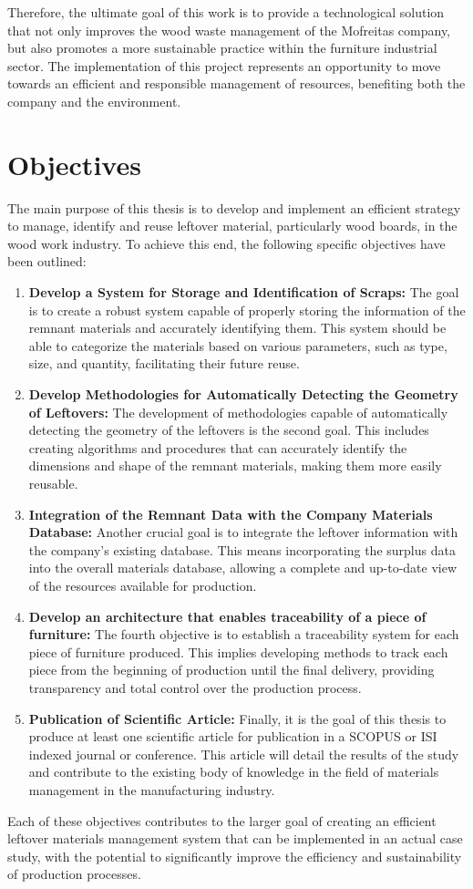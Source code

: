 Therefore, the ultimate goal of this work is to provide a technological solution that not only improves the wood waste management of the Mofreitas company, but also promotes a more sustainable practice within the furniture industrial sector. The implementation of this project represents an opportunity to move towards an efficient and responsible management of resources, benefiting both the company and the environment.


\section{Objectives}\label{cap:intro:objectives}

The main purpose of this thesis is to develop and implement an efficient strategy to manage, identify and reuse leftover material, particularly wood boards, in the wood work industry. To achieve this end, the following specific objectives have been outlined:

\begin{enumerate}
    \item \textbf{Develop a System for Storage and Identification of Scraps:} The goal is to create a robust system capable of properly storing the information of the remnant materials and accurately identifying them. This system should be able to categorize the materials based on various parameters, such as type, size, and quantity, facilitating their future reuse.
    
    \item \textbf{Develop Methodologies for Automatically Detecting the Geometry of Leftovers:} The development of methodologies capable of automatically detecting the geometry of the leftovers is the second goal. This includes creating algorithms and procedures that can accurately identify the dimensions and shape of the remnant materials, making them more easily reusable.
    
    \item \textbf{Integration of the Remnant Data with the Company Materials Database:} Another crucial goal is to integrate the leftover information with the company's existing database. This means incorporating the surplus data into the overall materials database, allowing a complete and up-to-date view of the resources available for production.
    
    \item \textbf{Develop an architecture that enables traceability of a piece of furniture:} The fourth objective is to establish a traceability system for each piece of furniture produced. This implies developing methods to track each piece from the beginning of production until the final delivery, providing transparency and total control over the production process.
    
    \item \textbf{Publication of Scientific Article:} Finally, it is the goal of this thesis to produce at least one scientific article for publication in a SCOPUS or ISI indexed journal or conference. This article will detail the results of the study and contribute to the existing body of knowledge in the field of materials management in the manufacturing industry.
\end{enumerate}

Each of these objectives contributes to the larger goal of creating an efficient leftover materials management system that can be implemented in an actual case study, with the potential to significantly improve the efficiency and sustainability of production processes.
